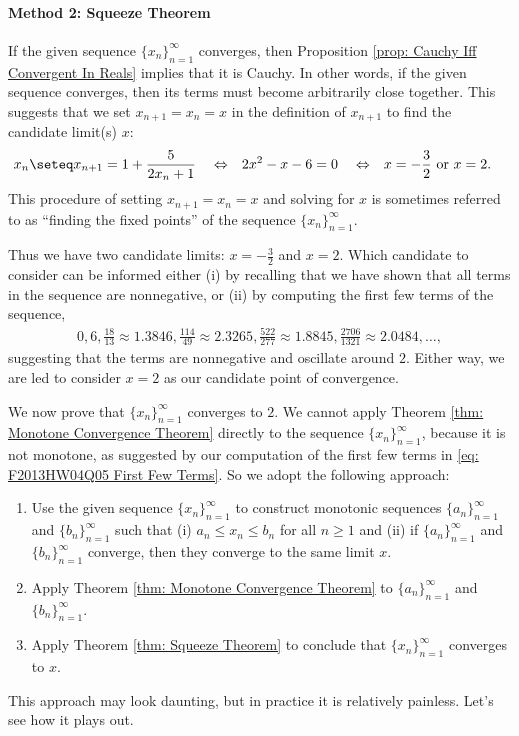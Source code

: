 \paragraph{Method 2: Squeeze Theorem}

If the given sequence $\{ x_{n} \}_{n=1}^{\infty}$ converges, then Proposition \ref{prop: Cauchy Iff Convergent In Reals} implies that it is Cauchy. In other words, if the given sequence converges, then its terms must become arbitrarily close together. This suggests that we set $x_{n+1} = x_{n} = x$ in the definition of $x_{n+1}$ to find the candidate limit(s) $x$:
\begin{align*}
x_{n} &\seteq x_{n+1} = 1 + \frac{5}{2 x_{n} + 1}
&
&\Leftrightarrow
&
2 x^{2} - x - 6 &= 0
&
&\Leftrightarrow
&
x &= -\frac{3}{2} \text{ or } x = 2.
\end{align*}
This procedure of setting $x_{n+1} = x_{n} = x$ and solving for $x$ is sometimes referred to as ``finding the fixed points'' of the sequence $\{ x_{n} \}_{n=1}^{\infty}$.

Thus we have two candidate limits: $x = -\frac{3}{2}$ and $x = 2$. Which candidate to consider can be informed either (i) by recalling that we have shown that all terms in the sequence are nonnegative, or (ii) by computing the first few terms of the sequence,
\begin{align}
0,6,\frac{18}{13} \approx 1.3846,\frac{114}{49} \approx 2.3265, \frac{522}{277} \approx 1.8845, \frac{2706}{1321} \approx 2.0484, \ldots,\label{eq: F2013HW04Q05 First Few Terms}
\end{align}
suggesting that the terms are nonnegative and oscillate around $2$. Either way, we are led to consider $x = 2$ as our candidate point of convergence.

We now prove that $\{ x_{n} \}_{n=1}^{\infty}$ converges to $2$. %
We cannot apply Theorem \ref{thm: Monotone Convergence Theorem} directly to the sequence $\{ x_{n} \}_{n=1}^{\infty}$, because it is not monotone, as suggested by our computation of the first few terms in \eqref{eq: F2013HW04Q05 First Few Terms}. %
So we adopt the following approach:
\begin{enumerate}
\item Use the given sequence $\{ x_{n} \}_{n=1}^{\infty}$ to construct monotonic sequences $\{ a_{n} \}_{n=1}^{\infty}$ and $\{ b_{n} \}_{n=1}^{\infty}$ such that (i) $a_{n} \leq x_{n} \leq b_{n}$ for all $n \geq 1$ and (ii) if $\{ a_{n} \}_{n=1}^{\infty}$ and $\{ b_{n} \}_{n=1}^{\infty}$ converge, then they converge to the same limit $x$.
\item Apply Theorem \ref{thm: Monotone Convergence Theorem} to $\{ a_{n} \}_{n=1}^{\infty}$ and $\{ b_{n} \}_{n=1}^{\infty}$.
\item Apply Theorem \ref{thm: Squeeze Theorem} to conclude that $\{ x_{n} \}_{n=1}^{\infty}$ converges to $x$.
\end{enumerate}
This approach may look daunting, but in practice it is relatively painless. Let's see how it plays out.


